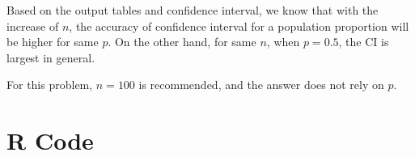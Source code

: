 \documentclass[12pt,letterpaper,titlepage,en-US]{article}
\begin{document}
Based on the output tables and confidence interval, we know that with the increase of $n$, the accuracy of confidence interval for a population proportion will be higher for same $p$. On the other hand, for same $n$, when $p = 0.5$, the CI is largest in general.

For this problem, $n = 100$ is recommended, and the answer does not rely on $p$.

\pagebreak

\section{R Code}


\end{document}
